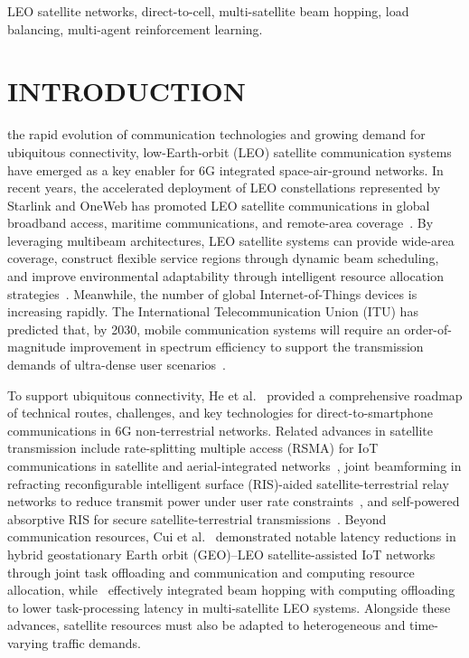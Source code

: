 \documentclass[journal]{IEEEtran}
\newcommand{\revbegin}[1]{\color{revisionblue}\ignorespaces}
\newcommand{\revend}[1]{\color{black}\ignorespaces}
\begin{document}
\begin{IEEEkeywords}
LEO satellite networks, direct-to-cell, multi-satellite beam hopping, load balancing, multi-agent reinforcement learning.
\end{IEEEkeywords}

\section{INTRODUCTION}
\label{sec:introduction}
 the rapid evolution of communication technologies and growing demand for ubiquitous connectivity, low-Earth-orbit (LEO) satellite communication systems have emerged as a key enabler for 6G integrated space-air-ground networks. In recent years, the accelerated deployment of LEO constellations represented by Starlink and OneWeb has promoted LEO satellite communications in global broadband access, maritime communications, and remote-area coverage~\cite{ref1,ref2}. By leveraging multibeam architectures, LEO satellite systems can provide wide-area coverage, construct flexible service regions through dynamic beam scheduling, and improve environmental adaptability through intelligent resource allocation strategies~\cite{ref3}. Meanwhile, the number of global Internet-of-Things devices is increasing rapidly. The International Telecommunication Union (ITU) has predicted that, by 2030, mobile communication systems will require an order-of-magnitude improvement in spectrum efficiency to support the transmission demands of ultra-dense user scenarios~\cite{ref4}.

\revbegin{}To support ubiquitous connectivity, He et al.~\cite{refD2S} provided a comprehensive roadmap of technical routes, challenges, and key technologies for direct-to-smartphone communications in 6G non-terrestrial networks. Related advances in satellite transmission include rate-splitting multiple access (RSMA) for IoT communications in satellite and aerial-integrated networks~\cite{refRSMA}, joint beamforming in refracting reconfigurable intelligent surface (RIS)-aided satellite-terrestrial relay networks to reduce transmit power under user rate constraints~\cite{refRefractingRIS}, and self-powered absorptive RIS for secure satellite-terrestrial transmissions~\cite{refSecureRIS}. Beyond communication resources, Cui et al.~\cite{refCuiLatency2023} demonstrated notable latency reductions in hybrid geostationary Earth orbit (GEO)--LEO satellite-assisted IoT networks through joint task offloading and communication and computing resource allocation, while~\cite{refCuiOffloading2026} effectively integrated beam hopping with computing offloading to lower task-processing latency in multi-satellite LEO systems. Alongside these advances, satellite resources must also be adapted to heterogeneous and time-varying traffic demands.\revend{}
\end{document}
